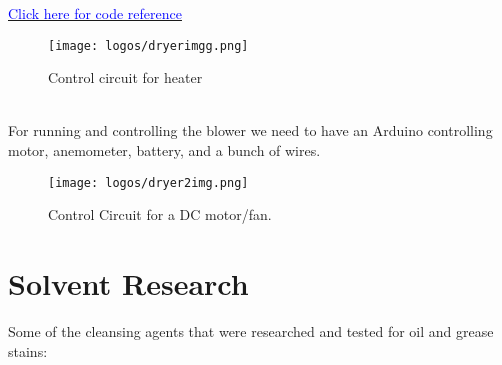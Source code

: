 \documentclass[table,french,english]{rapportCS}
\begin{document}
\href{https://github.com/naunidhsingh03/ELP305-TribeD-Resources/blob/5ba1988fe283faba21ba7098978bb225e509d5cb/Codes/dryer.ino}{\textcolor{blue}{Click here for code reference}}
\newpage

\begin{figure}[h]
    \centering
    \vspace{0.1cm}
    \texttt{[image: logos/dryerimgg.png]}
    \caption{Control circuit for heater}
    \label{fig:outlinemindmap}
\end{figure}\\
For running and controlling the blower we need to have an Arduino controlling motor, anemometer, battery, and a bunch of wires.
\begin{figure}[h]
    \centering
    \texttt{[image: logos/dryer2img.png]}
    \caption{Control Circuit for a DC motor/fan.}
    \label{fig:outlinemindmap}
\end{figure}

\newpage

\section{Solvent Research}
Some of the cleansing agents that were researched and tested for oil and grease stains:
\end{document}
